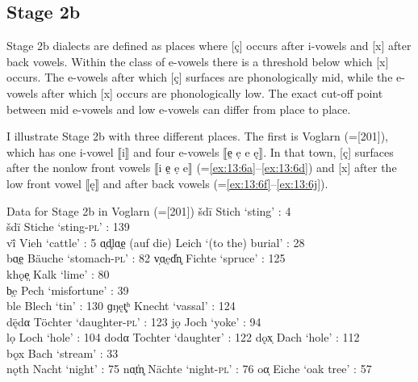 \subsection{Stage 2b }\label{sec:13.3.3}

Stage 2b dialects are defined as places where [ç] occurs after i-vowels and [x] after back vowels. Within the class of e-vowels there is a threshold below which [x] occurs. The e-vowels after which [ç] surfaces are phonologically mid, while the e-vowels after which [x] occurs are phonologically low. The exact cut-off point between mid e-vowels and low e-vowels can differ from place to place.

I illustrate Stage 2b with three different places. The first is Voglarn (=[201]), which has one i-vowel ⟦i⟧ and four e-vowels ⟦e̤ ẹ e ę⟧. In that town, [ç] surfaces after the nonlow front vowels ⟦i e̤ ẹ e⟧ (=\ref{ex:13:6a}--\ref{ex:13:6d}) and [x] after the low front vowel ⟦ę⟧  and after back vowels (=\ref{ex:13:6f}--\ref{ex:13:6j}).

\ea%
\label{ex:13:6}Data for Stage 2b in Voglarn (=[201])
\ea\label{ex:13:6a} šdī \tab Stich \tab ‘sting’ : 4\\
    šdï \tab Stiche \tab ‘sting-\textsc{pl}’ : 139\\
    v\"{î} \tab Vieh \tab ‘cattle’ : 5
\ex\label{ex:13:6b} ɑ̣d̥lɑ̣e̤ \tab (auf die) Leich \tab ‘(to the) burial’ : 28\\
    bɑ̣e̤ \tab Bäuche \tab ‘stomach-\textsc{pl}’ : 82
\ex\label{ex:13:6c} v̩ɑ̣ẹd͐n̥ \tab Fichte \tab ‘spruce’ : 125\\
    khǫẹ̩ \tab Kalk \tab  ‘lime’ : 80\\
    b̩ẹ \tab Pech \tab ‘misfortune’ : 39\\
\ex\label{ex:13:6d} ble \tab Blech \tab ‘tin’ : 130
\ex\label{ex:13:6e} ɡŋęt͓ʰ \tab Knecht \tab ‘vassal’ : 124\\
    d\"{ę}dα \tab Töchter \tab ‘daughter-\textsc{pl}’ : 123
\ex\label{ex:13:6f} jọ \tab Joch \tab ‘yoke’ : 94\\
    lọ \tab Loch \tab ‘hole’ : 104
\ex\label{ex:13:6g} dodα \tab Tochter \tab ‘daughter’ : 122
\ex\label{ex:13:6h} dǫx̩ \tab Dach \tab ‘hole’ : 112\\
    bǫx \tab Bach \tab ‘stream’ : 33\\
    nǫth \tab Nacht \tab ‘night’ : 75
\ex\label{ex:13:6i} nɑ̣t͐n̥ \tab Nächte \tab ‘night-\textsc{pl}' : 76
\ex\label{ex:13:6j} oα̩ \tab Eiche \tab ‘oak tree’ : 57
\z
\z 

